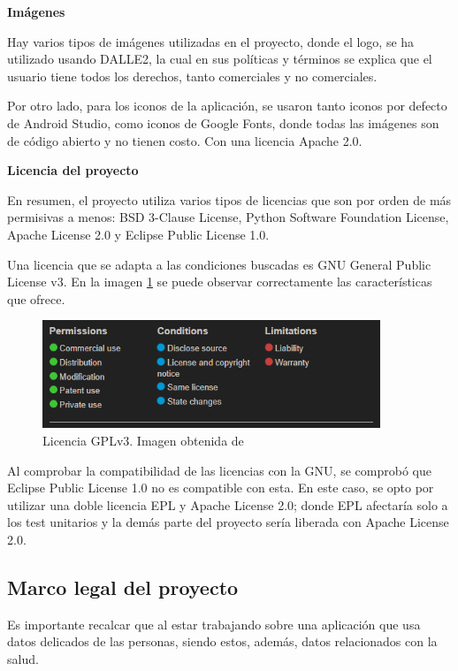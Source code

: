 \textbf{Imágenes}

Hay varios tipos de imágenes utilizadas en el proyecto, donde el logo, se ha utilizado usando DALLE2, la cual en sus políticas y términos se explica que el usuario tiene todos los derechos, tanto comerciales y no comerciales.

Por otro lado, para los iconos de la aplicación, se usaron tanto iconos por defecto de Android Studio, como iconos de Google Fonts, donde todas las imágenes son de código abierto y no tienen costo. Con una licencia Apache 2.0.




\textbf{Licencia del proyecto}

En resumen, el proyecto utiliza varios tipos de licencias que son por orden de más permisivas a menos:  BSD 3-Clause License, Python Software Foundation License, Apache License 2.0 y Eclipse Public License 1.0.

Una licencia que se adapta a las condiciones buscadas es GNU General Public License v3. En la imagen \ref{fig:Licencia GPLv3} se puede observar correctamente las características que ofrece.
\begin{figure}[!ht]
         \centering
         \includegraphics[width=0.9\textwidth]{img/GPLv3.png}
         \caption{Licencia GPLv3. Imagen obtenida de \cite{choose-a-license}}
         \label{fig:Licencia GPLv3}
\end{figure}

Al comprobar la compatibilidad de las licencias con la GNU, se comprobó que Eclipse Public License 1.0 no es compatible con esta.
En este caso, se opto por utilizar una doble licencia EPL y Apache License 2.0; donde EPL afectaría solo a los test unitarios y la demás parte del proyecto sería liberada con Apache License 2.0.



\subsection{Marco legal del proyecto}

Es importante recalcar que al estar trabajando sobre una aplicación que usa datos delicados de las personas, siendo estos, además, datos relacionados con la salud. 

